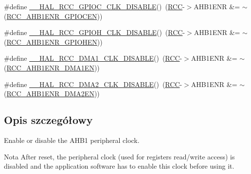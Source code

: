 \begin{DoxyCompactItemize}
\item 
\#define \hyperlink{group___r_c_c___a_h_b1___clock___enable___disable_ga0fc90c25d35f9b5b5f66961505de1cd4}{\+\_\+\+\_\+\+H\+A\+L\+\_\+\+R\+C\+C\+\_\+\+G\+P\+I\+O\+C\+\_\+\+C\+L\+K\+\_\+\+D\+I\+S\+A\+B\+LE}()~(\hyperlink{group___peripheral__declaration_ga74944438a086975793d26ae48d5882d4}{R\+CC}-\/$>$A\+H\+B1\+E\+NR \&= $\sim$(\hyperlink{group___peripheral___registers___bits___definition_gae8a8b42e33aef2a7bc2d41ad9d231733}{R\+C\+C\+\_\+\+A\+H\+B1\+E\+N\+R\+\_\+\+G\+P\+I\+O\+C\+EN}))
\item 
\#define \hyperlink{group___r_c_c___a_h_b1___clock___enable___disable_ga1eb7dd0a520cef518fb624bf7117b7e1}{\+\_\+\+\_\+\+H\+A\+L\+\_\+\+R\+C\+C\+\_\+\+G\+P\+I\+O\+H\+\_\+\+C\+L\+K\+\_\+\+D\+I\+S\+A\+B\+LE}()~(\hyperlink{group___peripheral__declaration_ga74944438a086975793d26ae48d5882d4}{R\+CC}-\/$>$A\+H\+B1\+E\+NR \&= $\sim$(\hyperlink{group___peripheral___registers___bits___definition_gadb16afc550121895822ebb22108196b6}{R\+C\+C\+\_\+\+A\+H\+B1\+E\+N\+R\+\_\+\+G\+P\+I\+O\+H\+EN}))
\item 
\#define \hyperlink{group___r_c_c___a_h_b1___clock___enable___disable_ga569dc8b9e178a8afab2664fdf87f46c5}{\+\_\+\+\_\+\+H\+A\+L\+\_\+\+R\+C\+C\+\_\+\+D\+M\+A1\+\_\+\+C\+L\+K\+\_\+\+D\+I\+S\+A\+B\+LE}()~(\hyperlink{group___peripheral__declaration_ga74944438a086975793d26ae48d5882d4}{R\+CC}-\/$>$A\+H\+B1\+E\+NR \&= $\sim$(\hyperlink{group___peripheral___registers___bits___definition_gae07b00778a51a4e52b911aeccb897aba}{R\+C\+C\+\_\+\+A\+H\+B1\+E\+N\+R\+\_\+\+D\+M\+A1\+EN}))
\item 
\#define \hyperlink{group___r_c_c___a_h_b1___clock___enable___disable_gaa97383d7ee14e9a638eb8c9ba35658f0}{\+\_\+\+\_\+\+H\+A\+L\+\_\+\+R\+C\+C\+\_\+\+D\+M\+A2\+\_\+\+C\+L\+K\+\_\+\+D\+I\+S\+A\+B\+LE}()~(\hyperlink{group___peripheral__declaration_ga74944438a086975793d26ae48d5882d4}{R\+CC}-\/$>$A\+H\+B1\+E\+NR \&= $\sim$(\hyperlink{group___peripheral___registers___bits___definition_ga664a5d572a39a0c084e4ee7c1cf7df0d}{R\+C\+C\+\_\+\+A\+H\+B1\+E\+N\+R\+\_\+\+D\+M\+A2\+EN}))
\end{DoxyCompactItemize}


\subsection{Opis szczegółowy}
Enable or disable the A\+H\+B1 peripheral clock. 

\begin{DoxyNote}{Nota}
After reset, the peripheral clock (used for registers read/write access) is disabled and the application software has to enable this clock before using it. 
\end{DoxyNote}


